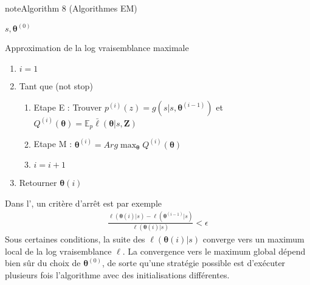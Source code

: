 \documentclass[letterpaper,10pt,english]{jupyterBook}
\begin{document}
\begin{sphinxadmonition}{note}{Algorithm 8 (Algorithmes EM)}



\sphinxAtStartPar
{} \(s,\boldsymbol\theta^{(0)}\)

\sphinxAtStartPar
{} Approximation de la log vraisemblance maximale
\begin{enumerate}
%
\item {} 
\sphinxAtStartPar
\(i=1\)

\item {} 
\sphinxAtStartPar
Tant que (not stop)
\begin{enumerate}
%
\item {} 
\sphinxAtStartPar
Etape E : Trouver \(p^{(i)}(z) = g(s|s,\boldsymbol\theta^{(i-1)})\) et \(Q^{(i)}(\boldsymbol\theta)=\mathbb{E}_p \bar\ell(\boldsymbol \theta |s,\mathbf Z)\)

\item {} 
\sphinxAtStartPar
Etape M : \(\boldsymbol\theta^{(i)} = Arg \displaystyle\max_{\boldsymbol\theta} Q^{(i)}(\boldsymbol\theta)\)

\item {} 
\sphinxAtStartPar
\(i = i+1\)

\end{enumerate}

\item {} 
\sphinxAtStartPar
Retourner \(\boldsymbol\theta{(i)}\)

\end{enumerate}
\end{sphinxadmonition}

\sphinxAtStartPar
Dans l’{\hyperref[\detokenize{clustering:EM}]{}}, un critère d’arrêt est par exemple
\begin{equation*}
\begin{split}\frac{\ell(\boldsymbol\theta{(i)}|s)-\ell(\boldsymbol\theta^{(i-1)}|s)}{\ell(\boldsymbol\theta{(i)}|s)}<\epsilon\end{split}
\end{equation*}
\sphinxAtStartPar
Sous certaines conditions, la suite des \(\ell(\boldsymbol\theta{(i)}|s)\) converge vers un maximum local de la log vraisemblance \(\ell\). La convergence vers le maximum global dépend bien sûr du choix de \(\boldsymbol\theta^{(0)}\), de sorte qu’une stratégie possible est d’exécuter plusieurs fois l’algorithme avec des initialisations différentes.
\end{document}
